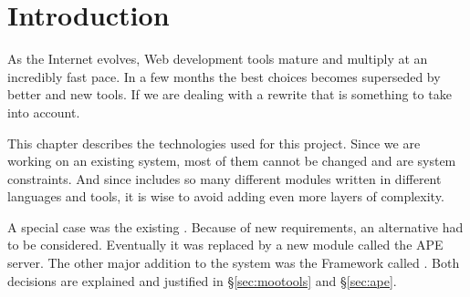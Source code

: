 \section{Introduction} %
\label{sec:intro2}

As the Internet evolves, Web development tools mature and multiply at an incredibly fast pace.
In a few months the best choices becomes superseded by better and new tools.
If we are dealing with a rewrite that is something to take into account.

This chapter describes the technologies used for this project.
Since we are working on an existing system, most of them cannot be changed and are system constraints.
And since  includes so many different modules written in different languages and tools, it is wise to avoid adding even more layers of complexity.

A special case was the existing .
Because of new requirements, an alternative had to be considered.
Eventually it was replaced by a new module called the \ac{APE} server.
The other major addition to the system was the  Framework called .
Both decisions are explained and justified in \S\ref{sec:mootools} and  \S\ref{sec:ape}.

